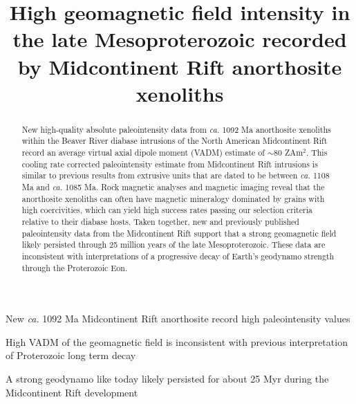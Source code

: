 \documentclass[draft]{agujournal2019}
\begin{document}
\title{High geomagnetic field intensity in the late Mesoproterozoic recorded by Midcontinent Rift anorthosite xenoliths}





\begin{keypoints}
\item New \textit{ca.} 1092 Ma Midcontinent Rift anorthosite record high paleointensity values
\item High VADM of the geomagnetic field is inconsistent with previous interpretation of Proterozoic long term decay
\item A strong geodynamo like today likely persisted for about 25 Myr during the Midcontinent Rift development
\end{keypoints}





\begin{abstract}
New high-quality absolute paleointensity data from \textit{ca.} 1092 Ma anorthosite xenoliths within the Beaver River diabase intrusions of the North American Midcontinent Rift record an average virtual axial dipole moment (VADM) estimate of $\sim$80 ZAm$^2$. This cooling rate corrected paleointensity estimate from Midcontinent Rift intrusions is similar to previous results from extrusive units that are dated to be between \textit{ca.} 1108 Ma and \textit{ca.} 1085 Ma. Rock magnetic analyses and magnetic imaging reveal that the anorthosite xenoliths can often have magnetic mineralogy dominated by grains with high coercivities, which can yield high success rates passing our selection criteria relative to their diabase hosts. Taken together, new and previously published paleointensity data from the Midcontinent Rift support that a strong geomagnetic field likely persisted through 25 million years of the late Mesoproterozoic. These data are inconsistent with interpretations of a progressive decay of Earth's geodynamo strength through the Proterozoic Eon. 

\end{abstract}
\end{document}
